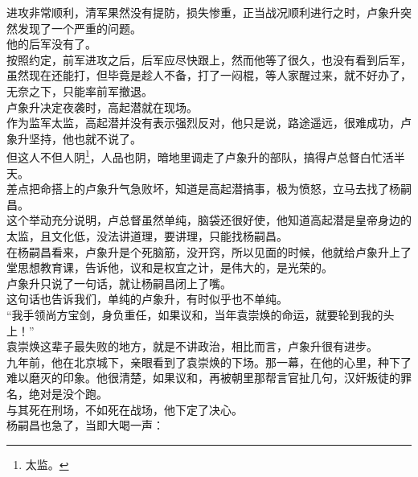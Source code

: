 \begin{multicols}{\theparacolNo}
进攻非常顺利，清军果然没有提防，损失惨重，正当战况顺利进行之时，卢象升突然发现了一个严重的问题。\\

他的后军没有了。\\

按照约定，前军进攻之后，后军应尽快跟上，然而他等了很久，也没有看到后军，虽然现在还能打，但毕竟是趁人不备，打了一闷棍，等人家醒过来，就不好办了，无奈之下，只能率前军撤退。\\

卢象升决定夜袭时，高起潜就在现场。\\

作为监军太监，高起潜并没有表示强烈反对，他只是说，路途遥远，很难成功，卢象升坚持，他也就不说了。\\

但这人不但人阴\footnote{太监。}，人品也阴，暗地里调走了卢象升的部队，搞得卢总督白忙活半天。\\

差点把命搭上的卢象升气急败坏，知道是高起潜搞事，极为愤怒，立马去找了杨嗣昌。\\

这个举动充分说明，卢总督虽然单纯，脑袋还很好使，他知道高起潜是皇帝身边的太监，且文化低，没法讲道理，要讲理，只能找杨嗣昌。\\

在杨嗣昌看来，卢象升是个死脑筋，没开窍，所以见面的时候，他就给卢象升上了堂思想教育课，告诉他，议和是权宜之计，是伟大的，是光荣的。\\

卢象升只说了一句话，就让杨嗣昌闭上了嘴。\\

这句话也告诉我们，单纯的卢象升，有时似乎也不单纯。\\

“我手领尚方宝剑，身负重任，如果议和，当年袁崇焕的命运，就要轮到我的头上！”\\

袁崇焕这辈子最失败的地方，就是不讲政治，相比而言，卢象升很有进步。\\

九年前，他在北京城下，亲眼看到了袁崇焕的下场。那一幕，在他的心里，种下了难以磨灭的印象。他很清楚，如果议和，再被朝里那帮言官扯几句，汉奸叛徒的罪名，绝对是没个跑。\\

与其死在刑场，不如死在战场，他下定了决心。\\

杨嗣昌也急了，当即大喝一声：\\


\end{multicols}
